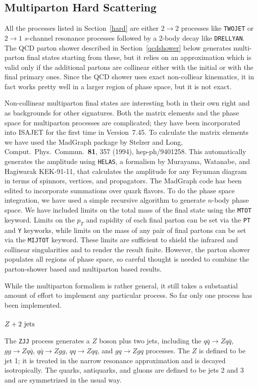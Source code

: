 \subsection{Multiparton Hard Scattering}

      All the processes listed in Section~\ref{hard} are either $2\to2$
processes like \verb|TWOJET| or $2\to1$ $s$-channel resonance processes
followed by a 2-body decay like \verb|DRELLYAN|. The QCD parton shower
described in Section~\ref{qcdshower} below generates multi-parton final
states starting from these, but it relies on an approximation which is
valid only if the additional partons are collinear either with the
initial or with the final primary ones. Since the QCD shower uses exact
non-colliear kinematics, it in fact works pretty well in a larger region
of phase space, but it is not exact.

      Non-collinear multiparton final states are interesting both in
their own right and as backgrounds for other signatures. Both the matrix
elements and the phase space for multiparton processes are complicated;
they have been incorporated into ISAJET for the first time in
Version~7.45. To calculate the matrix elements we have used the MadGraph
package by Stelzer and Long, Comput.\ Phys.\ Commun.\ {\bf81}, 357
(1994), hep-ph/9401258. This automatically generates the amplitude using
\verb|HELAS|, a formalism by Murayama, Watanabe, and Hagiwarak
KEK-91-11, that calculates the amplitude for any Feynman diagram in
terms of spinnors, vertices, and propagators. The MadGraph code has been
edited to incorporate summations over quark flavors. To do the phase
space integration, we have used a simple recursive algorithm to generate
$n$-body phase space. We have included limits on the total mass of the
final state using the \verb|MTOT| keyword. Limits on the $p_T$ and
rapidity of each final parton can be set via the \verb|PT| and \verb|Y|
keyworks, while limits on the mass of any pair of final partons can be
set via the \verb|MIJTOT| keyword. These limits are sufficient to shield
the infrared and collinear singularities and to render the result
finite. However, the parton shower populates all regions of phase space,
so careful thought is needed to combine the parton-shower based and
multiparton based results.

      While the multiparton formalism is rather general, it still takes
a substantial amount of effort to implement any particular process. So
far only one process has been implemented.

\subsubsection{$Z + {\rm 2\ jets}$} The \verb|ZJJ| process generates a
$Z$ boson plus two jets, including the $q\bar{q} \to Z q \bar{q}$, $gg
\to Z q\bar{q}$, $q\bar{q} \to Zgg$, $qq \to Zqq$, and $gq \to Z gq$
processes. The $Z$ is defined to be jet 1; it is treated in the narrow
resonance approximation and is decayed isotropically. The quarks,
antiquarks, and gluons are defined to be jets 2 and 3 and are
symmetrized in the usual way.

